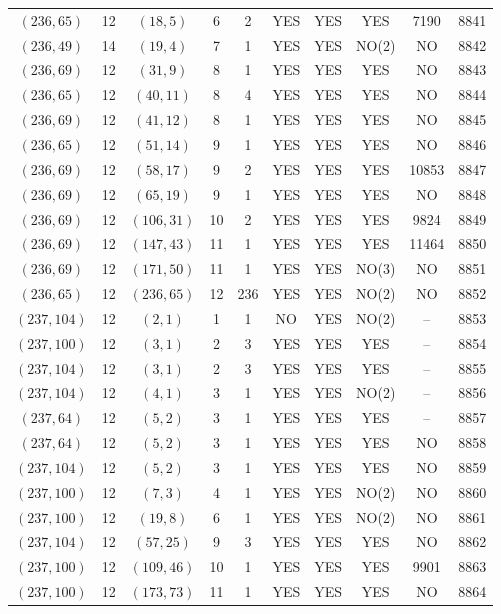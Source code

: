\begin{longtable}{|c|c|c|c|c|c|c|c|c|c|}
$(236, 65)$ & 12 & $(18, 5)$ & 6 & 2 & YES & YES & YES & 7190 & 8841\\
$(236, 49)$ & 14 & $(19, 4)$ & 7 & 1 & YES & YES & NO(2) & NO & 8842\\
$(236, 69)$ & 12 & $(31, 9)$ & 8 & 1 & YES & YES & YES & NO & 8843\\
$(236, 65)$ & 12 & $(40, 11)$ & 8 & 4 & YES & YES & YES & NO & 8844\\
$(236, 69)$ & 12 & $(41, 12)$ & 8 & 1 & YES & YES & YES & NO & 8845\\
$(236, 65)$ & 12 & $(51, 14)$ & 9 & 1 & YES & YES & YES & NO & 8846\\
$(236, 69)$ & 12 & $(58, 17)$ & 9 & 2 & YES & YES & YES & 10853 & 8847\\
$(236, 69)$ & 12 & $(65, 19)$ & 9 & 1 & YES & YES & YES & NO & 8848\\
$(236, 69)$ & 12 & $(106, 31)$ & 10 & 2 & YES & YES & YES & 9824 & 8849\\
$(236, 69)$ & 12 & $(147, 43)$ & 11 & 1 & YES & YES & YES & 11464 & 8850\\
$(236, 69)$ & 12 & $(171, 50)$ & 11 & 1 & YES & YES & NO(3) & NO & 8851\\
$(236, 65)$ & 12 & $(236, 65)$ & 12 & 236 & YES & YES & NO(2) & NO & 8852\\
$(237, 104)$ & 12 & $(2, 1)$ & 1 & 1 & NO & YES & NO(2) & -- & 8853\\
$(237, 100)$ & 12 & $(3, 1)$ & 2 & 3 & YES & YES & YES & -- & 8854\\
$(237, 104)$ & 12 & $(3, 1)$ & 2 & 3 & YES & YES & YES & -- & 8855\\
$(237, 104)$ & 12 & $(4, 1)$ & 3 & 1 & YES & YES & NO(2) & -- & 8856\\
$(237, 64)$ & 12 & $(5, 2)$ & 3 & 1 & YES & YES & YES & -- & 8857\\
$(237, 64)$ & 12 & $(5, 2)$ & 3 & 1 & YES & YES & YES & NO & 8858\\
$(237, 104)$ & 12 & $(5, 2)$ & 3 & 1 & YES & YES & YES & NO & 8859\\
$(237, 100)$ & 12 & $(7, 3)$ & 4 & 1 & YES & YES & NO(2) & NO & 8860\\
$(237, 100)$ & 12 & $(19, 8)$ & 6 & 1 & YES & YES & NO(2) & NO & 8861\\
$(237, 104)$ & 12 & $(57, 25)$ & 9 & 3 & YES & YES & YES & NO & 8862\\
$(237, 100)$ & 12 & $(109, 46)$ & 10 & 1 & YES & YES & YES & 9901 & 8863\\
$(237, 100)$ & 12 & $(173, 73)$ & 11 & 1 & YES & YES & YES & NO & 8864\\

\end{longtable}
